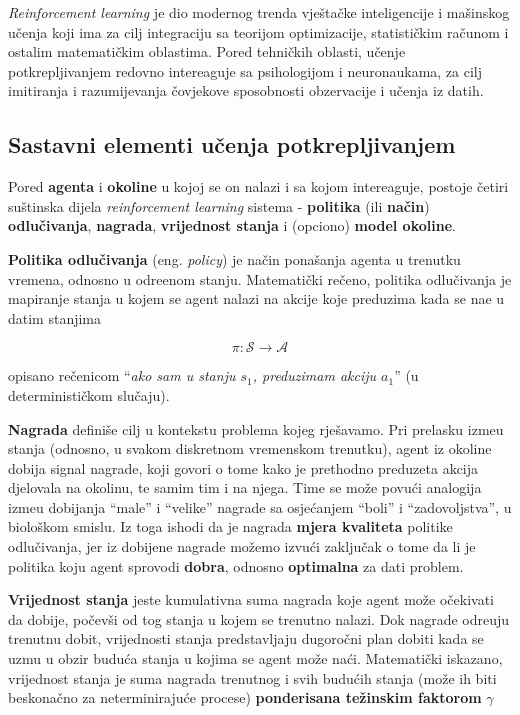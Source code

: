 \documentclass[12pt]{IEEEtran}
\numberwithin{equation}{subsection}
\numberwithin{figure}{subsection}
\theoremstyle{definition}
\numberwithin{example}{section}
\begin{document}
\textit{Reinforcement learning} je dio modernog trenda vje\v{s}ta\v{c}ke
inteligencije i ma\v{s}inskog u\v{c}enja koji ima za cilj integraciju
sa teorijom optimizacije, statisti\v{c}kim ra\v{c}unom i ostalim
matemati\v{c}kim oblastima. Pored tehni\v{c}kih oblasti,
u\v{c}enje potkrepljivanjem redovno intereaguje sa psihologijom
i neuronaukama, za cilj imitiranja i razumijevanja \v{c}ovjekove sposobnosti
obzervacije i u\v{c}enja iz datih.

\subsection{\textbf{Sastavni elementi u\v{c}enja potkrepljivanjem}}

Pored \textbf{agenta} i \textbf{okoline}
u kojoj se on nalazi i sa kojom intereaguje, postoje \v{c}etiri
su\v{s}tinska dijela \textit{reinforcement learning} sistema -
\textbf{politika} (ili \textbf{na\v{c}in}) \textbf{odlu\v{c}ivanja},
\textbf{nagrada}, \textbf{vrijednost stanja} i (opciono)
\textbf{model okoline}.

\textbf{Politika odlu\v{c}ivanja} (eng. \textit{policy}) je na\v{c}in pona\v{s}anja agenta
u trenutku vremena, odnosno u odre\dj{}enom stanju. Matemati\v{c}ki
re\v{c}eno, politika odlu\v{c}ivanja je mapiranje stanja u kojem se
agent nalazi na akcije koje preduzima kada se na\dj{}e u datim
stanjima

\begin{equation}
    \pi : \mathcal{S} \to \mathcal{A}
\end{equation}

opisano re\v{c}enicom \enquote{\textit{ako sam u stanju $s_1$,
        preduzimam akciju $a_1$}} (u deterministi\v{c}kom slu\v{c}aju).

\textbf{Nagrada} defini\v{s}e cilj u kontekstu problema kojeg rje\v{s}avamo.
Pri prelasku izme\dj{}u stanja (odnosno, u svakom diskretnom vremenskom trenutku),
agent iz okoline dobija signal nagrade, koji govori o tome kako je
prethodno preduzeta akcija djelovala na okolinu, te samim tim i na
njega. Time se mo\v{z}e povu\'{c}i analogija
izme\dj{}u dobijanja \enquote{male} i \enquote{velike} nagrade sa
osje\'{c}anjem \enquote{boli} i \enquote{zadovoljstva}, u biolo\v{s}kom smislu.
Iz toga ishodi da je nagrada \textbf{mjera kvaliteta} politike odlu\v{c}ivanja,
jer iz dobijene nagrade mo\v{z}emo izvu\'{c}i zaklju\v{c}ak o tome
da li je politika koju agent sprovodi \textbf{dobra}, odnosno \textbf{optimalna}
za dati problem.

\textbf{Vrijednost stanja} jeste kumulativna suma
nagrada koje agent mo\v{z}e o\v{c}ekivati da dobije, po\v{c}ev\v{s}i
od tog stanja u kojem se trenutno nalazi. Dok nagrade odre\dj{}uju
trenutnu dobit, vrijednosti stanja predstavljaju dugoro\v{c}ni
plan dobiti kada se uzmu u obzir budu\'{c}a stanja
u kojima se agent mo\v{z}e na\'{c}i. Matemati\v{c}ki iskazano,
vrijednost stanja je suma nagrada trenutnog i svih budu\'{c}ih
stanja (mo\v{z}e ih biti beskona\v{c}no za neterminiraju\'{c}e
procese) \textbf{ponderisana te\v{z}inskim faktorom} $\gamma$
\end{document}
